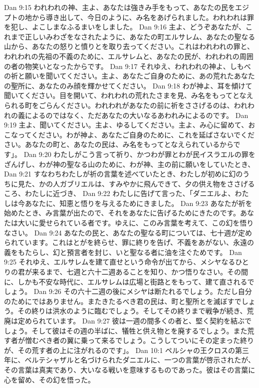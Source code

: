 Dan 9:15  われわれの神、主よ、あなたは強きみ手をもって、あなたの民をエジプトの地から導き出して、今日のように、み名をあげられました。われわれは罪を犯し、よこしまなふるまいをしました。
Dan 9:16  主よ、どうぞあなたが、これまで正しいみわざをなされたように、あなたの町エルサレム、あなたの聖なる山から、あなたの怒りと憤りとを取り去ってください。これはわれわれの罪と、われわれの先祖の不義のために、エルサレムと、あなたの民が、われわれの周囲の者の物笑いとなったからです。
Dan 9:17  それゆえ、われわれの神よ、しもべの祈と願いを聞いてください。主よ、あなたご自身のために、あの荒れたあなたの聖所に、あなたのみ顔を輝かせてください。
Dan 9:18  わが神よ、耳を傾けて聞いてください。目を開いて、われわれの荒れたさまを見、み名をもってとなえられる町をごらんください。われわれがあなたの前に祈をささげるのは、われわれの義によるのではなく、ただあなたの大いなるあわれみによるのです。
Dan 9:19  主よ、聞いてください。主よ、ゆるしてください。主よ、み心に留めて、おこなってください。わが神よ、あなたご自身のために、これを延ばさないでください。あなたの町と、あなたの民は、み名をもってとなえられているからです」。
Dan 9:20  わたしがこう言って祈り、かつわが罪とわが民イスラエルの罪をざんげし、わが神の聖なる山のために、わが神、主の前に願いをしていたとき、
Dan 9:21  すなわちわたしが祈の言葉を述べていたとき、わたしが初めに幻のうちに見た、かの人ガブリエルは、すみやかに飛んできて、夕の供え物をささげるころ、わたしに近づき、
Dan 9:22  わたしに告げて言った、「ダニエルよ、わたしは今あなたに、知恵と悟りを与えるためにきました。
Dan 9:23  あなたが祈を始めたとき、み言葉が出たので、それをあなたに告げるためにきたのです。あなたは大いに愛せられている者です。ゆえに、このみ言葉を考えて、この幻を悟りなさい。
Dan 9:24  あなたの民と、あなたの聖なる町については、七十週が定められています。これはとがを終らせ、罪に終りを告げ、不義をあがない、永遠の義をもたらし、幻と預言者を封じ、いと聖なる者に油を注ぐためです。
Dan 9:25  それゆえ、エルサレムを建て直せという命令が出てから、メシヤなるひとりの君が来るまで、七週と六十二週あることを知り、かつ悟りなさい。その間に、しかも不安な時代に、エルサレムは広場と街路とをもって、建て直されるでしょう。
Dan 9:26  その六十二週の後にメシヤは断たれるでしょう。ただし自分のためにではありません。またきたるべき君の民は、町と聖所とを滅ぼすでしょう。その終りは洪水のように臨むでしょう。そしてその終りまで戦争が続き、荒廃は定められています。
Dan 9:27  彼は一週の間多くの者と、堅く契約を結ぶでしょう。そして彼はその週の半ばに、犠牲と供え物とを廃するでしょう。また荒す者が憎むべき者の翼に乗って来るでしょう。こうしてついにその定まった終りが、その荒す者の上に注がれるのです」。
Dan 10:1  ペルシャの王クロスの第三年に、ベルテシャザルと名づけられたダニエルに、一つの言葉が啓示されたが、その言葉は真実であり、大いなる戦いを意味するものであった。彼はその言葉に心を留め、その幻を悟った。

